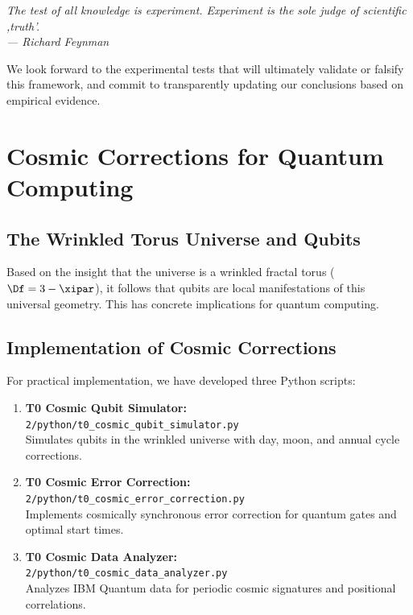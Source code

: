 \begin{center}
	\textit{The test of all knowledge is experiment. Experiment is the sole judge of scientific ,truth'.}\\
	\textit{--- Richard Feynman}
\end{center}

We look forward to the experimental tests that will ultimately validate or falsify this framework, and commit to transparently updating our conclusions based on empirical evidence.

\section{Cosmic Corrections for Quantum Computing}
\label{sec:cosmic_corrections}

\subsection{The Wrinkled Torus Universe and Qubits}

Based on the insight that the universe is a wrinkled fractal torus 
($\Df = 3 - \xipar$), it follows that qubits are local manifestations of this 
universal geometry. This has concrete implications for quantum computing.

\subsection{Implementation of Cosmic Corrections}

For practical implementation, we have developed three Python scripts:

\begin{enumerate}
	\item \textbf{T0 Cosmic Qubit Simulator:} \\
	\texttt{2/python/t0\_cosmic\_qubit\_simulator.py} \\
	Simulates qubits in the wrinkled universe with day, moon, and annual cycle corrections.
	
	\item \textbf{T0 Cosmic Error Correction:} \\
	\texttt{2/python/t0\_cosmic\_error\_correction.py} \\
	Implements cosmically synchronous error correction for quantum gates and optimal start times.
	
	\item \textbf{T0 Cosmic Data Analyzer:} \\
	\texttt{2/python/t0\_cosmic\_data\_analyzer.py} \\
	Analyzes IBM Quantum data for periodic cosmic signatures and positional correlations.
\end{enumerate}

